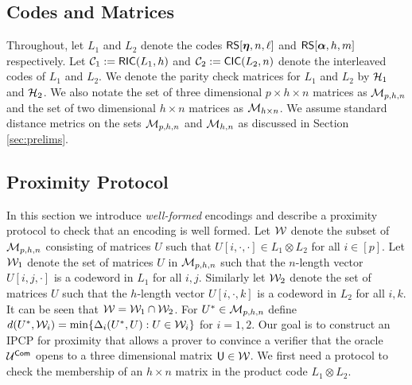 \subsection{Codes and Matrices}\label{sec:codesandmatrices}
Throughout, let $L_1$ and $L_2$ denote the codes $\mathsf{RS}[\bm{\eta},n,\ell]$ and
$\mathsf{RS}[\bm{\alpha},h,m]$ respectively. Let $\mathcal{C}_1 := \mathsf{RIC}(L_1,h)$ and $\mathcal{C}_2 :=
\mathsf{CIC}(L_2,n)$ denote the interleaved codes of $L_1$ and $L_2$. We denote the
parity check matrices for $L_1$ and $L_2$ by $\mathcal{H}_1$ and $\mathcal{H}_2$. We also
notate the set of three dimensional $p\times h\times n$ matrices as $\mathcal{M}_{p,h,n}$ and
the set of two dimensional $h\times n$ matrices as $\mathcal{M}_{h\times n}$. We
assume standard distance metrics on the sets $\mathcal{M}_{p,h,n}$ and $\mathcal{M}_{h,n}$
as discussed in Section \ref{sec:prelims}. 

\subsection{Proximity Protocol}\label{sec:proximityprotocols}
In this section we introduce {\em well-formed} encodings and
describe a proximity protocol to check that an encoding is well formed.
Let $\mathcal{W}$ denote the subset of $\mathcal{M}_{p,h,n}$
consisting of matrices $U$ such that $U[i,\cdot,\cdot]\in L_1\otimes L_2$ for all $i\in [p]$. 
Let $\mathcal{W}_1$ denote the set of matrices
$U$ in $\mathcal{M}_{p,h,n}$ such that the $n$-length vector $U[i,j,\cdot]$ is a
codeword in $L_1$ for all $i,j$. Similarly let $\mathcal{W}_2$ denote the set of
matrices $U$ such that the $h$-length vector $U[i,\cdot,k]$ is a codeword in
$L_2$ for all $i,k$. It can be seen that $\mathcal{W}=\mathcal{W}_1\cap \mathcal{W}_2$. For $U^\ast\in \mathcal{M}_{p,h,n}$ define
$d(U^\ast,\mathcal{W}_i)=\min\{\Delta_i(U^\ast,U):U\in \mathcal{W}_i\}$ for $i=1,2$.
Our goal is to construct an IPCP for proximity that allows a prover to convince a verifier that
the oracle $\mathcal{U}^{\mathsf{Com}}$ opens to a three dimensional matrix $\mathsf{U}\in \mathcal{W}$.
We first need a protocol to check the membership of an $h\times n$ matrix in the
product code $L_1\otimes L_2$.\smallskip

